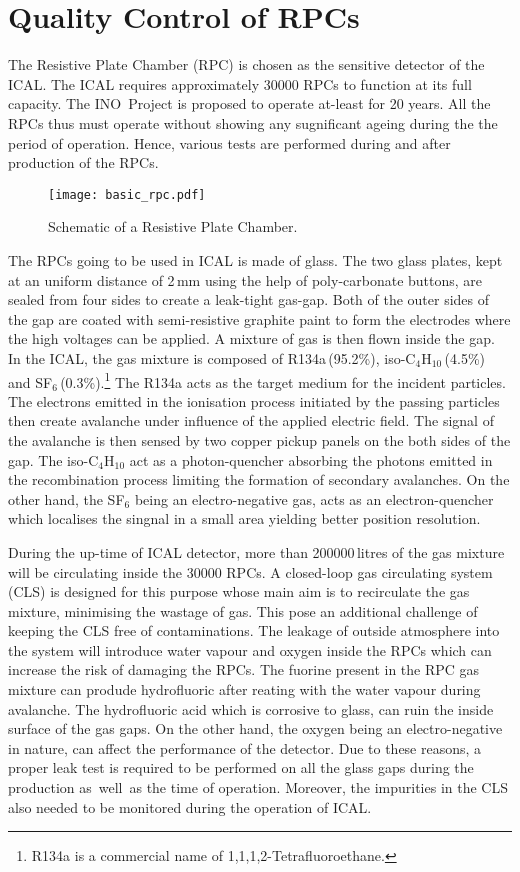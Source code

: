 \chapter{Quality Control of RPCs}
The Resistive Plate Chamber (RPC) is chosen as the sensitive detector of the ICAL. The ICAL requires approximately 30000 RPCs to function at its full capacity. The INO~Project is proposed to operate at-least for 20 years. All the RPCs thus must operate without showing any sugnificant ageing during the the period of operation. Hence, various tests are performed during and after production of the RPCs.
\begin{figure}[h]
  \centering
  \texttt{[image: basic\_rpc.pdf]}
  \caption{Schematic of a Resistive Plate Chamber.}
  \label{fig:rpc}
\end{figure}

The RPCs going to be used in ICAL is made of glass. The two glass plates, kept at an uniform distance of 2\,mm using the help of poly-carbonate buttons, are sealed from four sides to create a leak-tight gas-gap. Both of the outer sides of the gap are coated with semi-resistive graphite paint to form the electrodes where the high voltages can be applied. A mixture of gas is then flown inside the gap. In the ICAL, the gas mixture is composed of R134a\,(95.2\%), iso-C$_4$H$_{10}$\,(4.5\%) and SF$_6$\,(0.3\%).\footnote{R134a is a commercial name of 1,1,1,2-Tetrafluoroethane.} The R134a acts as the target medium for the incident particles. The electrons emitted in the ionisation process initiated by the passing particles then create avalanche under influence of the applied electric field. The signal of the avalanche is then sensed by two copper pickup panels on the both sides of the gap. The iso-C$_4$H$_{10}$ act as a photon-quencher absorbing the photons emitted in the recombination process limiting the formation of secondary avalanches. On the other hand, the SF$_6$ being an electro-negative gas, acts as an electron-quencher which localises the singnal in a small area yielding better position resolution.

During the up-time of ICAL detector, more than 200000\,litres of the gas mixture will be circulating inside the 30000 RPCs. A closed-loop gas circulating system (CLS) is designed for this purpose whose main aim is to recirculate the gas mixture, minimising the wastage of gas. This pose an additional challenge of keeping the CLS free of contaminations. The leakage of outside atmosphere into the system will introduce water vapour and oxygen inside the RPCs which can increase the risk of damaging the RPCs\cite{rpc_c,rpc_w}. The fuorine present in the RPC gas mixture can produde hydrofluoric after reating with the water vapour during avalanche. The hydrofluoric acid which is corrosive to glass, can ruin the inside surface of the gas gaps. On the other hand, the oxygen being an electro-negative in nature, can affect the performance of the detector. Due to these reasons, a proper leak test is required to be performed on all the glass gaps during the production as~well~as the time of operation. Moreover, the impurities in the CLS also needed to be monitored during the operation of ICAL.

